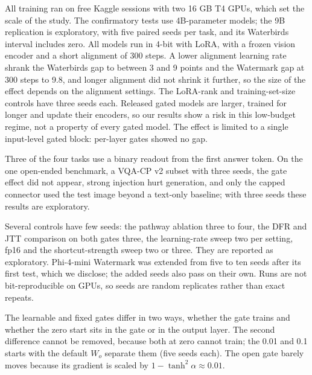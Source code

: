 All training ran on free Kaggle sessions with two 16 GB T4 GPUs, which set the scale of the study. The confirmatory
tests use 4B-parameter models; the 9B replication is exploratory, with five paired seeds per task, and its Waterbirds
interval includes zero. All models run in 4-bit with LoRA, with a frozen vision encoder and a short alignment of 300
steps. A lower alignment learning rate shrank the Waterbirds gap to between 3 and 9 points and the Watermark gap
at 300 steps to 9.8, and longer alignment did not shrink it further, so the size of the effect depends on the
alignment settings. The LoRA-rank and training-set-size controls have three seeds each. Released gated models are
larger, trained for longer and update their encoders, so our results show a risk in this low-budget regime, not a
property of every gated model. The effect is limited to a single input-level gated block: per-layer gates showed no
gap.

Three of the four tasks use a binary readout from the first answer token. On the one open-ended benchmark, a VQA-CP v2
subset with three seeds, the gate effect did not appear, strong injection hurt generation, and only the capped
connector used the test image beyond a text-only baseline; with three seeds these results are exploratory.

Several controls have few seeds: the pathway ablation three to four, the DFR and JTT comparison on both gates three,
the learning-rate sweep two per setting, fp16 and the shortcut-strength sweep two or three. They are reported as exploratory. Phi-4-mini Watermark was extended from five to
ten seeds after its first test, which we disclose; the added seeds also pass on their own. Runs are not
bit-reproducible on GPUs, so seeds are random replicates rather than exact repeats.

The learnable and fixed gates differ in two ways, whether the gate trains and whether the zero start sits in the gate
or in the output layer. The second difference cannot be removed, because both at zero cannot train; the 0.01 and
0.1 starts with the default \(W_o\) separate them (five seeds each). The open gate barely moves because its
gradient is scaled by \(1 - \tanh^2\alpha \approx 0.01\).


